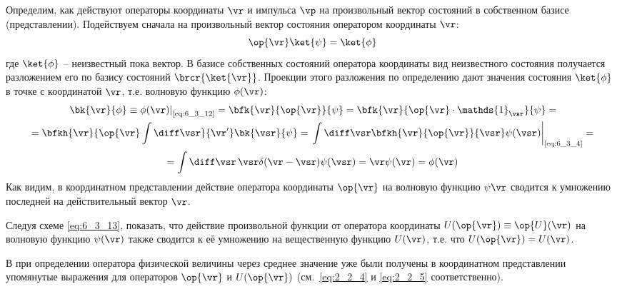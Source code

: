 Определим, как действуют операторы координаты $\vr$ и импульса $\vp$ на произвольный вектор состояний в собственном базисе (представлении). Подействуем сначала на произвольный вектор состояния оператором координаты $\vr$:%
%
\begin{equation}
\label{eq:6_3_12}
\op{\vr} \ket{\psi} = \ket{\phi}
\end{equation}%
%
где $\ket{\phi}$ -- неизвестный пока вектор. В базисе собственных состояний оператора координаты вид неизвестного состояния получается разложением его по базису состояний $\brcr{\ket{\vr}}$. Проекции этого разложения по определению дают значения состояния $\ket{\phi}$ в точке с координатой $\vr$, т.е. волновую функцию $\phi(\vr)$:%
%
\begin{equation}
\label{eq:6_3_13}
\begin{gathered}
	\left.\bk{\vr}{\phi} \equiv \phi(\vr)\right|_{\text{\eqref{eq:6_3_12}}} =
	\bfk{\vr}{\op{\vr}}{\psi} = 
	\bfk{\vr}{\op{\vr} \cdot \mathds{1}_{\vsr}}{\psi} = \\ =
	\bfkh{\vr}{\op{\vr}\int \diff\vsr}{\vr'} \bk{\vsr}{\psi} =
	\left.\int \diff\vsr \bfkh{\vr}{\op{\vr}}{\vsr} \psi(\vsr) \right|_{\text{\eqref{eq:6_3_4}}} = \\ =
 	\int \diff\vsr \, \vsr \delta(\vr - \vsr) \psi(\vsr) = \vr \psi(\vr) = \phi(\vr)
\end{gathered}
\end{equation}%
%
Как видим, в координатном представлении действие оператора координаты $\op{\vr}$ на волновую функцию $\psi{\vr}$ сводится к умножению последней на действительный вектор $\vr$.%
%
\begin{excr}
Следуя схеме \eqref{eq:6_3_13}, показать, что действие произвольной функции от оператора координаты $U(\op{\vr}) \equiv \op{U}(\vr)$ на волновую функцию $\psi(\vr)$ также сводится к её умножению на вещественную функцию $U(\vr)$, т.е. что $U(\op{\vr})=U(\vr)$.
\end{excr}%
%
В  при определении оператора физической величины через среднее значение уже были получены в координатном представлении упомянутые выражения для операторов $\op{\vr}$ и $U(\op{\vr})$ (см.~\eqref{eq:2_2_4} и \eqref{eq:2_2_5} соответственно).

